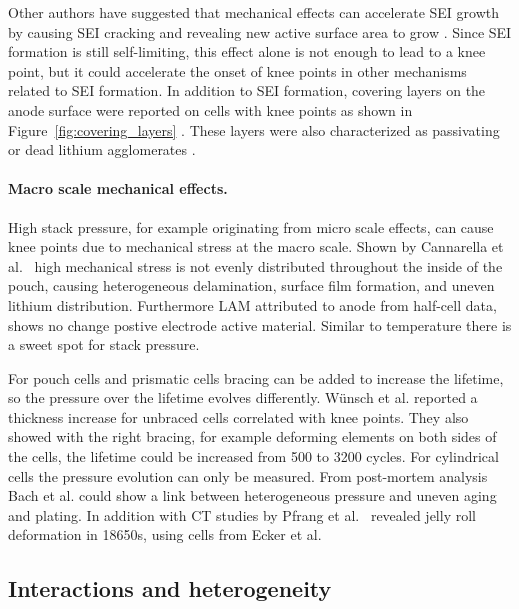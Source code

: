 \documentclass[journal=jpcl, manuscript=article, layout=onecolumn]{achemso}
\begin{document}
Other authors have suggested that mechanical effects can accelerate SEI growth by causing SEI cracking and revealing new active surface area to grow \cite{kupper_end--life_2018,louli_operando_2019}. Since SEI formation is still self-limiting, this effect alone is not enough to lead to a knee point, but it could accelerate the onset of knee points in other mechanisms related to SEI formation.
In addition to SEI formation, covering layers on the anode surface were reported on cells with knee points as shown in Figure~\ref{fig:covering_layers} \cite{lewerenz_post-mortem_2017,willenberg_development_2020,stiaszny_electrochemical_2014}. These layers were also characterized as passivating or dead lithium agglomerates \cite{schindler_fast_2018}.


\paragraph{Macro scale mechanical effects.}

High stack pressure, for example originating from micro scale effects, can cause knee points due to mechanical stress at the macro scale. Shown by Cannarella et al.~\cite{cannarella_stress_2014} high mechanical stress is not evenly distributed throughout the inside of the pouch, causing heterogeneous delamination, surface film formation, and uneven lithium distribution. Furthermore LAM attributed to anode from half-cell data, shows no change postive electrode active material. Similar to temperature there is a sweet spot for stack pressure\cite{cannarella_stress_2014}. 

For pouch cells \cite{wunsch_investigation_2019} and prismatic cells\cite{cannarella_stress_2014} bracing can be added to increase the lifetime, so the pressure over the lifetime evolves differently. Wünsch et al. \cite{wunsch_investigation_2019} reported a thickness increase for unbraced cells correlated with knee points. They also showed with the right bracing, for example deforming elements on both sides of the cells, the lifetime could be increased from 500 to 3200 cycles. For cylindrical cells\cite{willenberg_high-precision_2020} the pressure evolution can only be measured. From post-mortem analysis Bach et al. could show a link between heterogeneous pressure and uneven aging and plating\cite{bach_nonlinear_2016}.
In addition with CT studies by  Pfrang et al.~\cite{pfrang_long-term_2018} revealed jelly roll deformation in 18650s, using cells from Ecker et al. \cite{ecker_calendar_2014}

\subsection{Interactions and heterogeneity}
\end{document}
